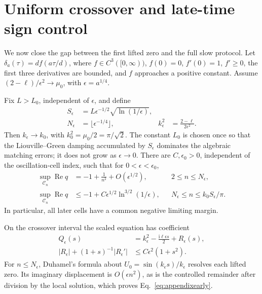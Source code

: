 \documentclass[reprint,superscriptaddress,floatfix,amsmath,amssymb,prresearch,aps]{revtex4-2}
\newcommand{\ii}{\mathrm{i}}
\newcommand{\Ree}{\operatorname{Re}}
\begin{document}
\section{Uniform crossover and late-time sign control}
\label{app:uniform}

We now close the gap between the first lifted zero and the full slow
protocol. Let \(\delta_a(\tau)=d f(a\tau/d)\), where
\(f\in C^3([0,\infty))\), \(f(0)=0\), \(f'(0)=1\), \(f'\geq0\), the
first three derivatives are bounded, and \(f\) approaches a positive
constant. Assume \((2-\ell)/\epsilon^2\to\mu_0\), with
\(\epsilon=a^{1/4}\).

Fix \(L>L_0\), independent of \(\epsilon\), and define
\begin{equation}
\begin{aligned}
S_\epsilon&=L\epsilon^{-1/2}\sqrt{\ln(1/\epsilon)},\\
N_\epsilon&=\lfloor\epsilon^{-1/4}\rfloor,
&k_\epsilon^2&=\frac{2-\ell}{2\epsilon^2}.
\end{aligned}
\label{eq:splitindices}
\end{equation}
Then \(k_\epsilon\to k_0\), with
\(k_0^2=\mu_0/2=\pi/\sqrt2\). The constant \(L_0\) is chosen once so that
the Liouville--Green damping accumulated by \(S_\epsilon\) dominates the
algebraic matching errors; it does not grow as \(\epsilon\to0\). There are
\(C,\epsilon_0>0\), independent of the oscillation-cell index, such that
for \(0<\epsilon<\epsilon_0\),
\begin{align}
\sup_{\mathcal C_n}\Ree q
&=-1+\frac1{n^2}+O(\epsilon^{1/2}),
&&2\leq n\leq N_\epsilon,
\label{eq:appendixearly}\\
\sup_{\mathcal C_n}\Ree q
&\leq-1+C\epsilon^{1/2}\ln^{3/2}(1/\epsilon),
&&N_\epsilon\leq n\leq k_0S_\epsilon/\pi.
\label{eq:appendixlate}
\end{align}
In particular, all later cells have a common negative limiting margin.

On the crossover interval the scaled equation has coefficient
\begin{equation}
\begin{aligned}
Q_\epsilon(s)&=k_\epsilon^2-\frac{\ii\ell\epsilon s}{2}
+R_\epsilon(s),\\
|R_\epsilon|+(1+s)^{-1}|R_\epsilon'|
&\leq C\epsilon^2(1+s^2).
\end{aligned}
\label{eq:Qremainder}
\end{equation}
For \(n\leq N_\epsilon\), Duhamel's formula about
\(U_0=\sin(k_\epsilon s)/k_\epsilon\) resolves each lifted zero. Its
imaginary displacement is \(O(\epsilon n^2)\), as is the controlled
remainder after division by the local solution, which proves
Eq.~\eqref{eq:appendixearly}.
\end{document}
